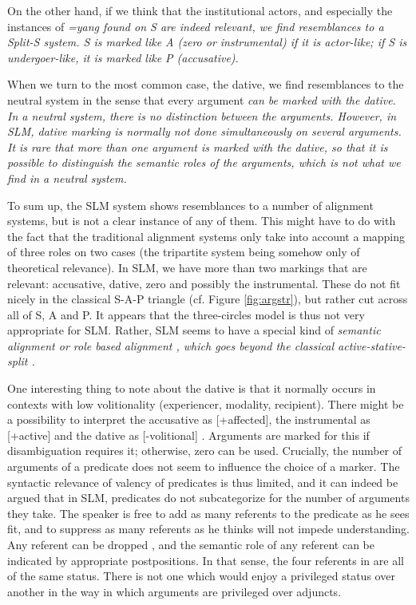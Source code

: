 On the other hand, if we think that the institutional actors, and especially the instances of \em =yang \em found on S are indeed relevant, we find resemblances to a Split-S system. S is marked like A (zero or instrumental) if it is actor-like; if S is undergoer-like, it is marked like P (accusative).

When we turn to the most common case, the dative, we find resemblances to the neutral system in the sense that every argument \em can \em be marked with the dative. In a neutral system, there is no distinction between the arguments. However, in SLM, dative marking is normally not done simultaneously on several arguments. It is rare that more than one argument is marked with the dative, so that it is possible to distinguish the semantic roles of the arguments, which is not what we find in a neutral system.

To sum up, the SLM system shows resemblances to a number of alignment systems, but is not a clear instance of any of them. This might have to do with the fact that the traditional alignment systems only take into account a mapping of  three roles on two cases (the tripartite system being somehow only of theoretical relevance). In SLM, we have more than two markings that are relevant: accusative, dative, zero and possibly the instrumental. These do not fit nicely in the classical S-A-P triangle (cf. Figure \ref{fig:argstr}), but rather cut across all of S, A and P. It appears that the three-circles model is thus not very appropriate for SLM. Rather, SLM seems to have a special kind of   \em semantic alignment \em \citep{DonohueEtAlEd2008} or  \em role based alignment \em \citep[328]{HengeveldEtAl2008fdg}, which goes beyond the classical active-stative-split \citep{Klimov1974}.

One interesting thing to note about the dative is that it normally occurs in contexts with low volitionality (experiencer, modality, recipient). There might be a possibility to interpret the accusative as [+affected], the instrumental as [+active] and the dative as [-volitional] \citep{Ansaldo2005ms}. Arguments are marked for this if disambiguation requires it; otherwise, zero can be used. Crucially, the number of arguments of a predicate does not seem to influence the choice of a marker. The syntactic relevance of valency of predicates is thus limited, and it can indeed be argued that in SLM, predicates do not subcategorize for the number of arguments they take. The speaker is free to add as many referents to the predicate as he sees fit, and to suppress as many referents as he thinks will not impede understanding. Any referent can be dropped , and the semantic role of any referent can be indicated by appropriate postpositions. In that sense, the four referents in  are all of the same status. There is not one which would enjoy a privileged status over another in the way in which arguments are privileged over adjuncts.


